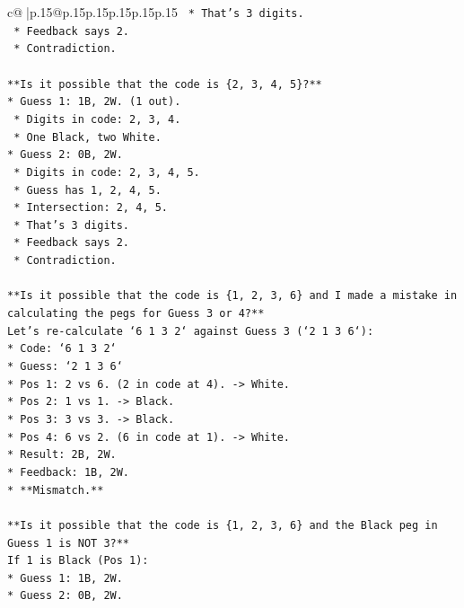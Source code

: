 \documentclass{article}
\begin{document}
{\begin{supertabular}{c@{$\;$}|p{.15\linewidth}@{}p{.15\linewidth}p{.15\linewidth}p{.15\linewidth}p{.15\linewidth}p{.15\linewidth}}
{{{\texttt{    *   That's 3 digits.} \\
\texttt{    *   Feedback says 2.} \\
\texttt{    *   Contradiction.} \\
\\ 
\texttt{**Is it possible that the code is \{2, 3, 4, 5\}?**} \\
\texttt{*   Guess 1: 1B, 2W. (1 out).} \\
\texttt{    *   Digits in code: 2, 3, 4.} \\
\texttt{    *   One Black, two White.} \\
\texttt{*   Guess 2: 0B, 2W.} \\
\texttt{    *   Digits in code: 2, 3, 4, 5.} \\
\texttt{    *   Guess has 1, 2, 4, 5.} \\
\texttt{    *   Intersection: 2, 4, 5.} \\
\texttt{    *   That's 3 digits.} \\
\texttt{    *   Feedback says 2.} \\
\texttt{    *   Contradiction.} \\
\\ 
\texttt{**Is it possible that the code is \{1, 2, 3, 6\} and I made a mistake in calculating the pegs for Guess 3 or 4?**} \\
\texttt{Let's re{-}calculate `6 1 3 2` against Guess 3 (`2 1 3 6`):} \\
\texttt{*   Code: `6 1 3 2`} \\
\texttt{*   Guess: `2 1 3 6`} \\
\texttt{*   Pos 1: 2 vs 6. (2 in code at 4). {-}> White.} \\
\texttt{*   Pos 2: 1 vs 1. {-}> Black.} \\
\texttt{*   Pos 3: 3 vs 3. {-}> Black.} \\
\texttt{*   Pos 4: 6 vs 2. (6 in code at 1). {-}> White.} \\
\texttt{*   Result: 2B, 2W.} \\
\texttt{*   Feedback: 1B, 2W.} \\
\texttt{*   **Mismatch.**} \\
\\ 
\texttt{**Is it possible that the code is \{1, 2, 3, 6\} and the Black peg in Guess 1 is NOT 3?**} \\
\texttt{If 1 is Black (Pos 1):} \\
\texttt{*   Guess 1: 1B, 2W.} \\
\texttt{*   Guess 2: 0B, 2W.} \\
}}}
\end{supertabular}}
\end{document}
